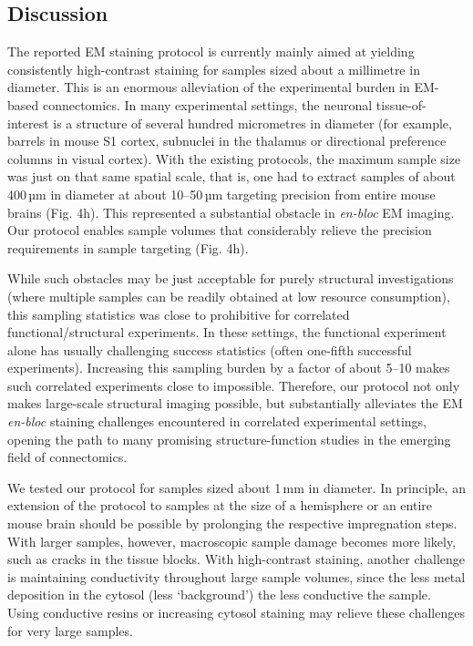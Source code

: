 \documentclass{article}
\begin{document}
\subsection*{Discussion}
The reported EM staining protocol is currently mainly aimed at yielding consistently high-contrast staining for samples sized about a millimetre in diameter. This is an enormous alleviation of the experimental burden in EM-based connectomics. In many experimental settings, the neuronal tissue-of-interest is a structure of several hundred micrometres in diameter (for example, barrels in mouse S1 cortex, subnuclei in the thalamus or directional preference columns in visual cortex). With the existing protocols, the maximum sample size was just on that same spatial scale, that is, one had to extract samples of about 400\,µm in diameter at about 10–50\,µm targeting precision from entire mouse brains (Fig. 4h). This represented a substantial obstacle in \emph{en-bloc} EM imaging. Our protocol enables sample volumes that considerably relieve the precision requirements in sample targeting (Fig. 4h).

While such obstacles may be just acceptable for purely structural investigations (where multiple samples can be readily obtained at low resource consumption), this sampling statistics was close to prohibitive for correlated functional/structural experiments. In these settings, the functional experiment alone has usually challenging success statistics (often one-fifth successful experiments). Increasing this sampling burden by a factor of about 5–10 makes such correlated experiments close to impossible. Therefore, our protocol not only makes large-scale structural imaging possible, but substantially alleviates the EM \emph{en-bloc} staining challenges encountered in correlated experimental settings, opening the path to many promising structure-function studies in the emerging field of connectomics.

We tested our protocol for samples sized about 1\,mm in diameter. In principle, an extension of the protocol to samples at the size of a hemisphere or an entire mouse brain should be possible by prolonging the respective impregnation steps. With larger samples, however, macroscopic sample damage becomes more likely, such as cracks in the tissue blocks. With high-contrast staining, another challenge is maintaining conductivity
throughout large sample volumes, since the less metal deposition in the cytosol (less `background') the less conductive the sample. Using conductive resins or increasing cytosol staining may relieve these challenges for very large samples.
\end{document}
